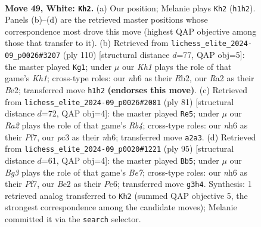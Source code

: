 \documentclass[11pt]{article}
\begin{document}
\clearpage

\begin{figure}[p]\centering
\begin{subfigure}{0.46\textwidth}\centering
\resizebox{\linewidth}{!}{%
\newchessgame
\chessboard[
  setfen={5b1r/p6p/P4k1n/2r5/8/1Pp3BP/R1P1B1P1/2R4K w - - 5 49},
  showmover=false,
  pgfstyle=straightmove, color=movearrow, markmove={h1-h2}
]}
\caption{}
\end{subfigure}\hfill
\begin{subfigure}{0.46\textwidth}\centering
\resizebox{\linewidth}{!}{%
\newchessgame
\chessboard[
  setfen={1r6/6pk/1n4p1/1P3r2/4p3/4P3/1R2BP1P/2R4K w - - 9 56},
  showmover=false,
  pgfstyle=straightmove, color=movearrow, markmove={h1-g1}
]}
\caption{}
\end{subfigure}
\\[4pt]
\begin{subfigure}{0.46\textwidth}\centering
\resizebox{\linewidth}{!}{%
\newchessgame
\chessboard[
  setfen={5r1k/5p1p/5P1N/pr4pP/8/P1p5/2P5/K6R b - - 1 41},
  showmover=false,
  pgfstyle=straightmove, color=movearrow, markmove={b5-e5}
]}
\caption{}
\end{subfigure}\hfill
\begin{subfigure}{0.46\textwidth}\centering
\resizebox{\linewidth}{!}{%
\newchessgame
\chessboard[
  setfen={1r4k1/r4p1p/4p1pP/4P1P1/p3R3/B7/4b1PK/2R5 b - - 18 48},
  showmover=false,
  pgfstyle=straightmove, color=movearrow, markmove={e2-b5}
]}
\caption{}
\end{subfigure}
\caption{\textbf{Move 49, White: \texttt{Kh2}.} (a) Our position; Melanie plays \texttt{Kh2} (\texttt{h1h2}). Panels (b)--(d) are the retrieved master positions whose correspondence most drove this move (highest QAP objective among those that transfer to it). (b) Retrieved from \texttt{lichess\_elite\_2024-09\_p0026\#3207} (ply 110) [structural distance $d$=77, QAP obj=5]: the master played \texttt{Kg1}; under $\mu$ our \emph{Kh1} plays the role of that game's \emph{Kh1}; cross-type roles: our \emph{n}h6 as their \emph{R}b2, our \emph{R}a2 as their \emph{B}e2; transferred move \texttt{h1h2} \textbf{(endorses this move)}. (c) Retrieved from \texttt{lichess\_elite\_2024-09\_p0026\#2081} (ply 81) [structural distance $d$=72, QAP obj=4]: the master played \texttt{Re5}; under $\mu$ our \emph{Ra2} plays the role of that game's \emph{Rb4}; cross-type roles: our \emph{n}h6 as their \emph{P}f7, our \emph{p}c3 as their \emph{n}h6; transferred move \texttt{a2a3}. (d) Retrieved from \texttt{lichess\_elite\_2024-09\_p0020\#1221} (ply 95) [structural distance $d$=61, QAP obj=4]: the master played \texttt{Bb5}; under $\mu$ our \emph{Bg3} plays the role of that game's \emph{Be7}; cross-type roles: our \emph{n}h6 as their \emph{P}f7, our \emph{B}e2 as their \emph{P}e6; transferred move \texttt{g3h4}. Synthesis: 1 retrieved analog transferred to \texttt{Kh2} (summed QAP objective 5, the strongest correspondence among the candidate moves); Melanie committed it via the \texttt{search} selector.}
\label{fig:thought-m96}
\end{figure}
\end{document}
